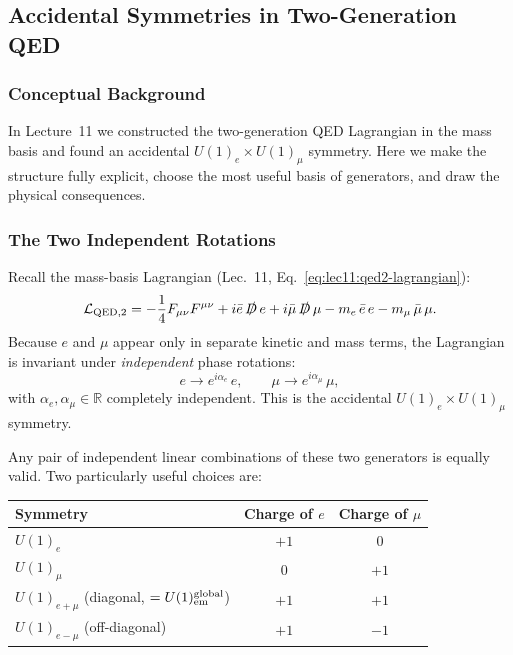\documentclass[../main.tex]{subfiles}
\begin{document}
\subsection*{Accidental Symmetries in Two-Generation QED}\label{sec:lec12:accidental}

\subsubsection*{Conceptual Background}

In Lecture~11 we constructed the two-generation QED Lagrangian in the mass basis and found an accidental $U(1)_e\times U(1)_\mu$ symmetry.  Here we make the structure fully explicit, choose the most useful basis of generators, and draw the physical consequences.

\subsubsection*{The Two Independent Rotations}

Recall the mass-basis Lagrangian (Lec.~11, Eq.~\eqref{eq:lec11:qed2-lagrangian}):
\begin{equation}
  \mathcal{L}_{\mathrm{QED},2}
  =
  -\frac{1}{4}F_{\mu\nu}F^{\mu\nu}
  + i\bar{e}\,\slashed{D}\,e
  + i\bar{\mu}\,\slashed{D}\,\mu
  - m_e\,\bar{e}\,e
  - m_\mu\,\bar{\mu}\,\mu.
  \label{eq:lec12:qed2}
\end{equation}
Because $e$ and $\mu$ appear only in separate kinetic and mass terms, the Lagrangian is invariant under \emph{independent} phase rotations:
\begin{equation}
  e \to e^{i\alpha_e}\,e,
  \qquad
  \mu \to e^{i\alpha_\mu}\,\mu,
  \label{eq:lec12:rotations}
\end{equation}
with $\alpha_e, \alpha_\mu \in \mathbb{R}$ completely independent.  This is the accidental $U(1)_e \times U(1)_\mu$ symmetry.

Any pair of independent linear combinations of these two generators is equally valid.  Two particularly useful choices are:

\begin{center}
\begin{tabular}{lcc}
  \toprule
  Symmetry & Charge of $e$ & Charge of $\mu$ \\
  \midrule
  $U(1)_e$      & $+1$ & $0$ \\
  $U(1)_\mu$    & $0$  & $+1$ \\
  \midrule
  $U(1)_{e+\mu}$ (diagonal, $= U(1)_{\rm em}^{\rm global}$) & $+1$ & $+1$ \\
  $U(1)_{e-\mu}$ (off-diagonal) & $+1$ & $-1$ \\
  \bottomrule
\end{tabular}
\end{center}
\end{document}
